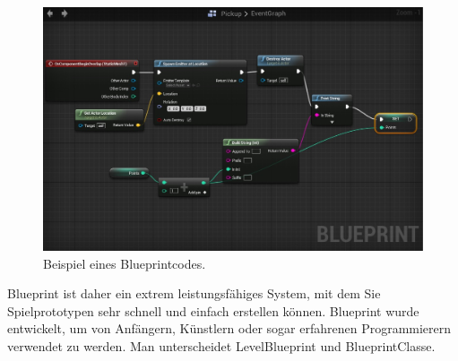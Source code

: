 \begin{figure}[h] \centering
\includegraphics[width=13cm]{Images/blueprint.png} 
\caption{ Beispiel eines Blueprintcodes. }
\label{vr-blueprint} 
\end{figure}

Blueprint ist daher ein extrem leistungsfähiges System, mit dem Sie Spielprototypen sehr schnell und einfach erstellen können. 
Blueprint wurde entwickelt, um von Anfängern, Künstlern oder sogar erfahrenen Programmierern verwendet zu werden. 
Man unterscheidet LevelBlueprint und BlueprintClasse.




